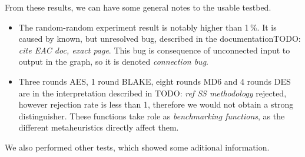 \documentclass[
  print, %
  Table,   %
  nolof,     %
  nolot,     %
  11pt, %
  oneside  %
]{fithesis3}
\newcommand{\todo}[1]{TODO: \textit{#1}}
\newcommand{\fd}{\cellcolor{red!13}}
\newcommand{\fn}{\cellcolor{green!13}}
\begin{document}

From these results, we can have some general notes to the usable testbed.

\begin{itemize}
    \item The random-random experiment result is notably higher than 1\,\%. It is caused by known, but unresolved bug, described in the documentation\todo{cite EAC doc, exact page}. This bug is consequence of unconnected input to output in the graph, so it is denoted \textit{connection bug}.
    \item Three rounds AES, 1 round BLAKE, eight rounds MD6 and 4 rounds DES are in the interpretation described in \todo{ref SS methodology} rejected, however rejection rate is less than 1, therefore we would not obtain a strong distinguisher. These functions take role as \textit{benchmarking functions}, as the different metaheuristics directly affect them.
\end{itemize}

We also performed other tests, which showed some aditional information.
\end{document}
